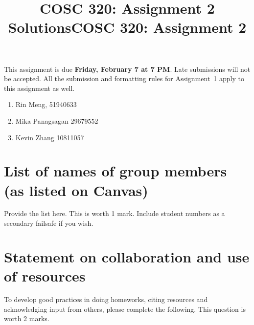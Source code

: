\documentclass[11pt,fleqn]{exam}
\title{COSC 320: Assignment 2 Solutions}
\title{COSC 320: Assignment 2}
\author{}
\date{}
\newif\ifsolutions\solutionsfalse
\begin{document}
\maketitle
\vspace{-0.5in}

\ifsolutions
\setcounter{section}{1}
\else
This assignment is due \textbf{Friday, February 7 at 7 PM}. Late submissions will not be accepted. All the submission and formatting rules for Assignment~1 apply to this assignment as well.  
\begin{enumerate}
   \item Rin Meng, 51940633
   \item Mika Panagsagan 29679552
	\item Kevin Zhang 10811057
\end{enumerate}
\section{List of names of group members (as listed on Canvas)}

Provide the list here. This is worth 1 mark. Include student numbers
as a secondary failsafe if you wish.

\section{Statement on collaboration and use of resources}
To develop good practices in doing homeworks,
citing resources and acknowledging input from others, please complete the following.
This question is worth 2 marks.
\end{document}
